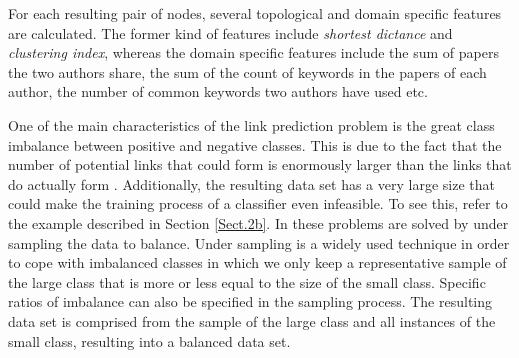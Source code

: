 \documentclass{acm_proc_article-sp}
\begin{document}
For each resulting pair of nodes, several topological and domain specific features are calculated. The former kind of features include \textit{shortest dictance }and \textit{clustering index}, whereas the domain specific features include the sum of papers the two authors share, the sum of the count of keywords in the papers of each author, the number of common keywords two authors have used etc. 

One of the main characteristics of the link prediction problem is the great class imbalance between positive and negative classes. This is due to the fact that the number of potential links that could form is enormously larger than the links that do actually form \cite{Lichtenwalter:2010:NPM:1835804.1835837}. Additionally, the resulting data set has a very large size that could make the training process of a classifier even infeasible. To see this, refer to the example described in Section \ref{Sect.2b}. In \cite{Hasan06linkprediction} these problems are solved by under sampling the data to balance. Under sampling is a widely used technique in order to cope with imbalanced classes in which we only keep a representative sample of the large class that is more or less equal to the size of the small class. Specific ratios of imbalance can also be specified in the sampling process. The resulting data set is comprised from the sample of the large class and all instances of the small class, resulting into a balanced data set. 





\end{document}
